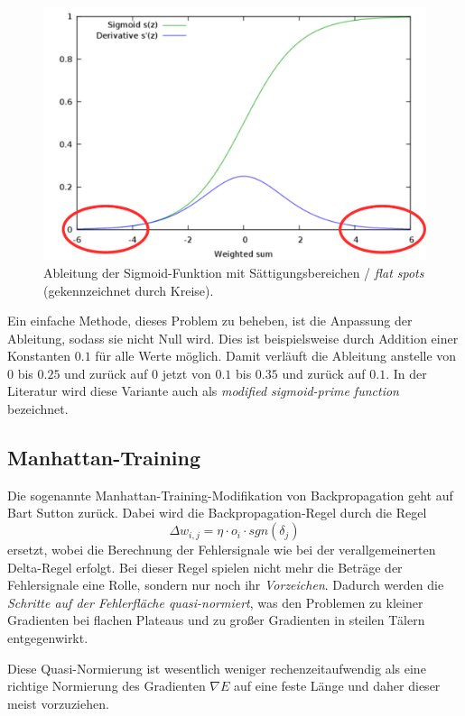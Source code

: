 \begin{figure}[ht!] \centering 
	\includegraphics[width=\linewidth]{figures/ch03_saettigung-sigmoid-ableitung.pdf}
	\caption{Ableitung der Sigmoid-Funktion mit Sättigungsbereichen / \emph{flat spots} (gekennzeichnet durch Kreise).}
	\label{fig:ch03_saettigung-sigmoid-ableitung}
\end{figure}

Ein einfache Methode, dieses Problem zu beheben, ist die Anpassung der Ableitung, sodass sie nicht Null wird. Dies ist beispielsweise durch Addition einer Konstanten $0.1$ für alle Werte möglich.
Damit verläuft die Ableitung anstelle von $0$ bis $0.25$ und zurück auf $0$ jetzt von $0.1$ bis $0.35$ und zurück auf $0.1$.
In der Literatur wird diese Variante auch als \emph{modified sigmoid-prime function} bezeichnet.


\subsection*{Manhattan-Training}
Die sogenannte Manhattan-Training-Modifikation von Backpropagation geht auf Bart Sutton zurück. Dabei wird die Backpropagation-Regel durch die Regel
\[
	\Delta w_{i,j} = \eta \cdot o_i \cdot sgn( \delta_j)
\]
ersetzt, wobei die Berechnung der Fehlersignale wie bei der verallgemeinerten Delta-Regel erfolgt. Bei dieser Regel spielen nicht mehr die Beträge der Fehlersignale eine Rolle, sondern nur noch ihr \emph{Vorzeichen}. Dadurch werden die \emph{Schritte auf der Fehlerfläche quasi-normiert}, was den Problemen zu kleiner Gradienten bei flachen Plateaus und zu großer Gradienten in steilen Tälern entgegenwirkt.

Diese Quasi-Normierung ist wesentlich weniger rechenzeitaufwendig als eine richtige Normierung des Gradienten $\nabla E$ auf eine feste Länge und daher dieser meist vorzuziehen.


